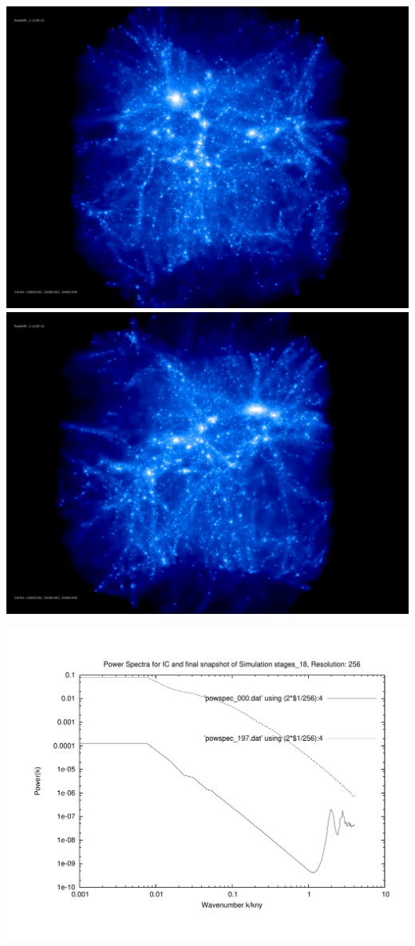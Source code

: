 \includegraphics[scale=0.1]{r256/h100/stages_18/rotate_00074.jpg} 
\includegraphics[scale=0.1]{r256/h100/stages_18/rotate_00131.jpg}

\includegraphics[scale=0.5]{r256/h100/stages_18/plot_powspec_stages_18}

